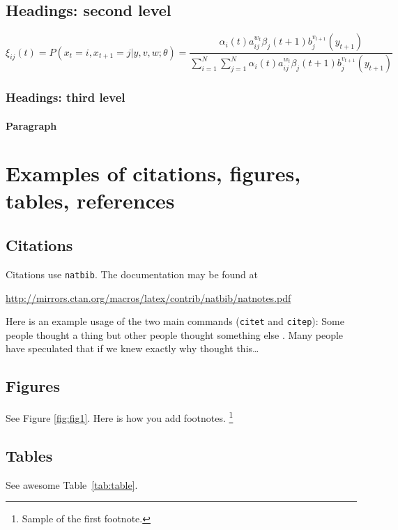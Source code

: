 \documentclass{article}
\begin{document}
\subsection{Headings: second level}
\lipsum[5]
\begin{equation}
	\xi _{ij}(t)=P(x_{t}=i,x_{t+1}=j|y,v,w;\theta)= {\frac {\alpha _{i}(t)a^{w_t}_{ij}\beta _{j}(t+1)b^{v_{t+1}}_{j}(y_{t+1})}{\sum _{i=1}^{N} \sum _{j=1}^{N} \alpha _{i}(t)a^{w_t}_{ij}\beta _{j}(t+1)b^{v_{t+1}}_{j}(y_{t+1})}}
\end{equation}

\subsubsection{Headings: third level}
\lipsum[6]

\paragraph{Paragraph}
\lipsum[7]



\section{Examples of citations, figures, tables, references}
\label{sec:others}

\subsection{Citations}
Citations use \verb+natbib+. The documentation may be found at
\begin{center}
	\url{http://mirrors.ctan.org/macros/latex/contrib/natbib/natnotes.pdf}
\end{center}

Here is an example usage of the two main commands (\verb+citet+ and \verb+citep+): Some people thought a thing \citep{kour2014real, hadash2018estimate} but other people thought something else \citep{kour2014fast}. Many people have speculated that if we knew exactly why \citet{kour2014fast} thought this\dots

\subsection{Figures}
\lipsum[10]
See Figure \ref{fig:fig1}. Here is how you add footnotes. \footnote{Sample of the first footnote.}
\lipsum[11]



\subsection{Tables}
See awesome Table~\ref{tab:table}.
\end{document}
